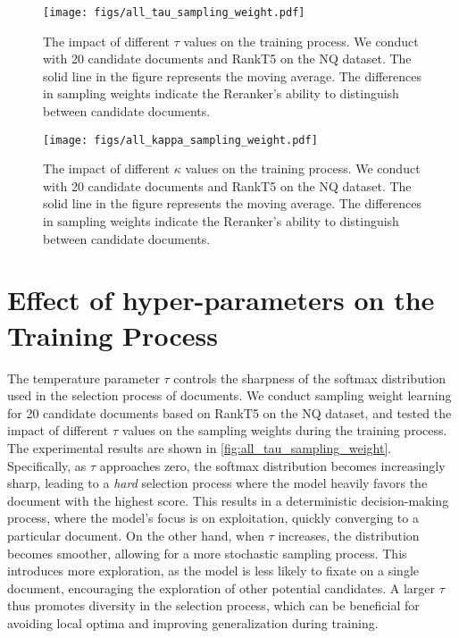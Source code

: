 \newpage
\begin{figure*}[!th]
  \texttt{[image: figs/all\_tau\_sampling\_weight.pdf]}
  \centering
\caption{The impact of different \(\tau\) values on the training process. We conduct with 20 candidate documents and RankT5 on the NQ dataset. The solid line in the figure represents the moving average. The differences in sampling weights indicate the Reranker's ability to distinguish between candidate documents.}
\label{fig:all_tau_sampling_weight}
\end{figure*}


\begin{figure*}[!th]
  \texttt{[image: figs/all\_kappa\_sampling\_weight.pdf]}
  \centering
\caption{The impact of different \(\kappa\) values on the training process. We conduct with 20 candidate documents and RankT5 on the NQ dataset. The solid line in the figure represents the moving average. The differences in sampling weights indicate the Reranker's ability to distinguish between candidate documents.}
\label{fig:all_kappa_sampling_weight}
\end{figure*}




\section{Effect of hyper-parameters on the Training Process}\label{sec: Effect of hyper-parameters on the Training Process}
The temperature parameter \(\tau\) controls the sharpness of the softmax distribution used in the selection process of documents. We conduct sampling weight learning for 20 candidate documents based on RankT5 on the NQ dataset, and tested the impact of different \(\tau\) values on the sampling weights during the training process. The experimental results are shown in \autoref{fig:all_tau_sampling_weight}. Specifically, as \(\tau\) approaches zero, the softmax distribution becomes increasingly sharp, leading to a \textit{hard} selection process where the model heavily favors the document with the highest score. This results in a deterministic decision-making process, where the model’s focus is on exploitation, quickly converging to a particular document. On the other hand, when \(\tau\) increases, the distribution becomes smoother, allowing for a more stochastic sampling process. This introduces more exploration, as the model is less likely to fixate on a single document, encouraging the exploration of other potential candidates. A larger \(\tau\) thus promotes diversity in the selection process, which can be beneficial for avoiding local optima and improving generalization during training.

